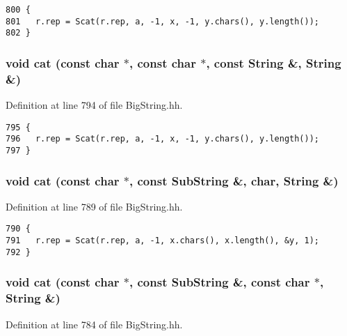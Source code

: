 \footnotesize\begin{verbatim}800 {
801   r.rep = Scat(r.rep, a, -1, x, -1, y.chars(), y.length());
802 }
\end{verbatim}\normalsize 
{}
\subsubsection{\setlength{\rightskip}{0pt plus 5cm}void cat (const char $\ast$, const char $\ast$, const String \&, String \&)\hspace{0.3cm}{\tt  [friend]}}\label{classString_l33}




Definition at line 794 of file Big\-String.hh.



\footnotesize\begin{verbatim}795 {
796   r.rep = Scat(r.rep, a, -1, x, -1, y.chars(), y.length());
797 }
\end{verbatim}\normalsize 
{}
\subsubsection{\setlength{\rightskip}{0pt plus 5cm}void cat (const char $\ast$, const {\bf Sub\-String} \&, char, String \&)\hspace{0.3cm}{\tt  [friend]}}\label{classString_l32}




Definition at line 789 of file Big\-String.hh.



\footnotesize\begin{verbatim}790 {
791   r.rep = Scat(r.rep, a, -1, x.chars(), x.length(), &y, 1);
792 }
\end{verbatim}\normalsize 
{}
\subsubsection{\setlength{\rightskip}{0pt plus 5cm}void cat (const char $\ast$, const {\bf Sub\-String} \&, const char $\ast$, String \&)\hspace{0.3cm}{\tt  [friend]}}\label{classString_l31}




Definition at line 784 of file Big\-String.hh.



